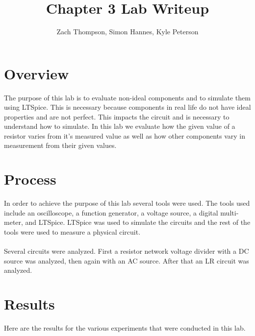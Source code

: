 \documentclass{article}
\title{Chapter 3 Lab Writeup}
\author{Zach Thompson, Simon Hannes, Kyle Peterson}
\begin{document}
\maketitle{}

\section*{Overview}
\paragraph{}
The purpose of this lab is to evaluate non-ideal components and to simulate them using LTSpice. This is necessary because components in real life
do not have ideal properties and are not perfect. This impacts the circuit and is necessary to understand how to simulate. In this lab we evaluate how the 
given value of a resistor varies from it's measured value as well as how other components vary in measurement from their given values. 


\section*{Process}
\paragraph{}
In order to achieve the purpose of this lab several tools were used. The tools used include an oscilloscope, a function generator, a voltage source, 
a digital multi-meter, and LTSpice. LTSpice was used to simulate the circuits and the rest of the tools were used to measure a physical circuit.

\paragraph{}
Several circuits were analyzed. First a resistor network voltage divider with a DC source was analyzed, then again with an AC source. After that an LR circuit 
was analyzed.

\section*{Results}
\paragraph{}
Here are the results for the various experiments that were conducted in this lab.
\end{document}
